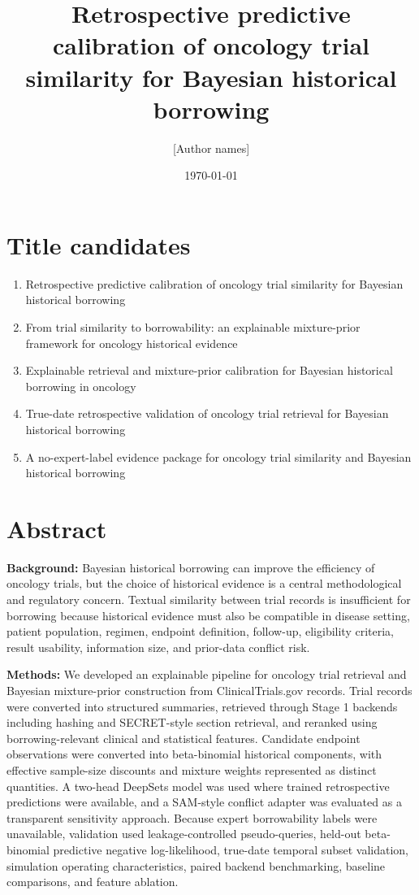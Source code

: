\documentclass[11pt]{article}
\title{Retrospective predictive calibration of oncology trial similarity for Bayesian historical borrowing}
\author{[Author names]}
\date{\today}
\begin{document}
\maketitle

\section*{Title candidates}

\begin{enumerate}[leftmargin=*]
  \item Retrospective predictive calibration of oncology trial similarity for Bayesian historical borrowing
  \item From trial similarity to borrowability: an explainable mixture-prior framework for oncology historical evidence
  \item Explainable retrieval and mixture-prior calibration for Bayesian historical borrowing in oncology
  \item True-date retrospective validation of oncology trial retrieval for Bayesian historical borrowing
  \item A no-expert-label evidence package for oncology trial similarity and Bayesian historical borrowing
\end{enumerate}

\section*{Abstract}

\textbf{Background:}
Bayesian historical borrowing can improve the efficiency of oncology trials, but the choice of historical evidence is a central methodological and regulatory concern. Textual similarity between trial records is insufficient for borrowing because historical evidence must also be compatible in disease setting, patient population, regimen, endpoint definition, follow-up, eligibility criteria, result usability, information size, and prior-data conflict risk.

\textbf{Methods:}
We developed an explainable pipeline for oncology trial retrieval and Bayesian mixture-prior construction from ClinicalTrials.gov records. Trial records were converted into structured summaries, retrieved through Stage 1 backends including hashing and SECRET-style section retrieval, and reranked using borrowing-relevant clinical and statistical features. Candidate endpoint observations were converted into beta-binomial historical components, with effective sample-size discounts and mixture weights represented as distinct quantities. A two-head DeepSets model was used where trained retrospective predictions were available, and a SAM-style conflict adapter was evaluated as a transparent sensitivity approach. Because expert borrowability labels were unavailable, validation used leakage-controlled pseudo-queries, held-out beta-binomial predictive negative log-likelihood, true-date temporal subset validation, simulation operating characteristics, paired backend benchmarking, baseline comparisons, and feature ablation.
\end{document}
